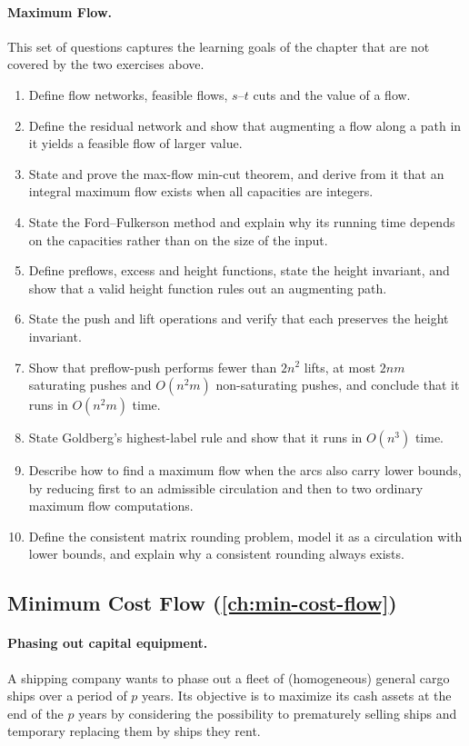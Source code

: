 \paragraph{Maximum Flow.}
This set of questions captures the learning goals of the chapter that are not
covered by the two exercises above.
\begin{enumerate}
  \item Define flow networks, feasible flows, $s$--$t$ cuts and the value of a
        flow.
  \item Define the residual network and show that augmenting a flow along a
        path in it yields a feasible flow of larger value.
  \item State and prove the max-flow min-cut theorem, and derive from it that
        an integral maximum flow exists when all capacities are integers.
  \item State the Ford--Fulkerson method and explain why its running time
        depends on the capacities rather than on the size of the input.
  \item Define preflows, excess and height functions, state the height
        invariant, and show that a valid height function rules out an
        augmenting path.
  \item State the push and lift operations and verify that each preserves the
        height invariant.
  \item Show that preflow-push performs fewer than $2n^2$ lifts, at most $2nm$
        saturating pushes and $O(n^2m)$ non-saturating pushes, and conclude
        that it runs in $O(n^2m)$ time.
  \item State Goldberg's highest-label rule and show that it runs in $O(n^3)$
        time.
  \item Describe how to find a maximum flow when the arcs also carry lower
        bounds, by reducing first to an admissible circulation and then to two
        ordinary maximum flow computations.
  \item Define the consistent matrix rounding problem, model it as a
        circulation with lower bounds, and explain why a consistent rounding
        always exists.
\end{enumerate}

\subsection*{Minimum Cost Flow (\cref{ch:min-cost-flow})}

\paragraph{Phasing out capital equipment.}
A shipping company wants to phase out a fleet of (homogeneous) general cargo
ships over a period of $p$ years. Its objective is to maximize its cash assets at
the end of the $p$ years by considering the possibility to prematurely selling
ships and temporary replacing them by ships they rent.

